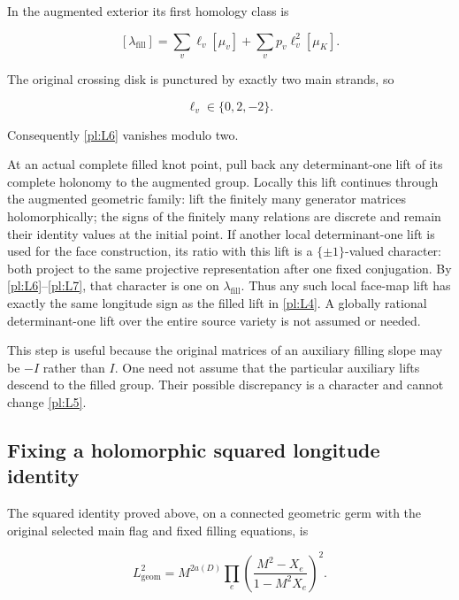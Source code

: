 In the augmented exterior its first homology class is

\begin{equation}\label{pl:L6}
[\lambda_{\mathrm{fill}}]
      =\sum_v\ell_v[\mu_v]
           +\sum_vp_v\ell_v^2[\mu_K].
\end{equation}

The original crossing disk is punctured by exactly two main
strands, so

\begin{equation}\label{pl:L7}
\ell_v\in\{0,2,-2\}.
\end{equation}

Consequently \eqref{pl:L6} vanishes modulo two.

At an actual complete filled knot point, pull back any
determinant-one lift of its complete holonomy to the augmented
group. Locally this lift continues through the augmented geometric
family: lift the finitely many generator matrices holomorphically;
the signs of the finitely many relations are discrete and remain
their identity values at the initial point.
If another local determinant-one lift is used for the face
construction, its ratio with this lift is a
\(\{\pm1\}\)-valued character: both project to the same
projective representation after one fixed conjugation.
By \eqref{pl:L6}--\eqref{pl:L7}, that character is one on
\(\lambda_{\mathrm{fill}}\).
Thus any such local face-map lift has exactly the same longitude
sign as the filled lift in \eqref{pl:L4}. A globally rational
determinant-one lift over the entire source variety is not
assumed or needed.

This step is useful because the original matrices of an auxiliary
filling slope may be \(-I\) rather than \(I\). One need not
assume that the particular auxiliary lifts descend to the filled
group. Their possible discrepancy is a character and cannot
change \eqref{pl:L5}.

\subsection{Fixing a holomorphic squared longitude identity}\label{pl:fixing-a-holomorphic-squared-longitude-identity}

The squared identity proved above, on a connected geometric germ
with the original selected main flag and fixed filling equations, is

\begin{equation}\label{pl:L8}
L_{\mathrm{geom}}^2
     =M^{2a(D)}
          \prod_e\left(\frac{M^2-X_e}{1-M^2X_e}\right)^2.
\end{equation}

